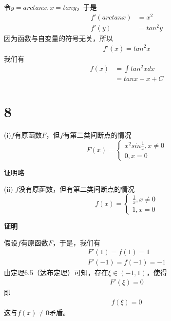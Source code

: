 \documentclass{article}
\begin{document}
令$y = arctan x, x = tan y$，于是
\begin{align*}
  f'(arctan x) & = x^2     \\
  f'(y)        & = tan^2 y
\end{align*}
因为函数与自变量的符号无关，所以
\begin{align*}
  f'(x) = tan^2 x
\end{align*}
我们有
\begin{align*}
  f(x) & = \int tan^2 x dx \\
       & = tanx - x + C
\end{align*}

\section*{8}

 (i)$f$有原函数$F$，但$f$有第二类间断点的情况
\begin{equation*}
  F(x) =
  \begin{cases*}
    x^2 sin \frac{1}{x}, x \neq 0 \\
    0, x = 0
  \end{cases*}
\end{equation*}

证明略

(ii) $f$没有原函数，但有第二类间断点的情况
\begin{equation*}
  f(x) =
  \begin{cases*}
    \frac{1}{x}, x \neq 0 \\
    1, x = 0
  \end{cases*}
\end{equation*}

\textbf{证明}

假设$f$有原函数$F$，于是，我们有
\begin{align*}
  F'(1) = f(1) = 1 \\
  F'(-1) = f(-1) = -1
\end{align*}
由定理6.5（达布定理）可知，存在$\xi \in (-1, 1)$，使得
\begin{align*}
  F'(\xi) = 0
\end{align*}
即
\begin{align*}
  f(\xi) = 0
\end{align*}
这与$f(x) \neq 0$矛盾。
\end{document}
